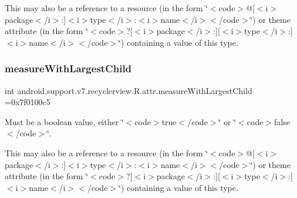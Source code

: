 This may also be a reference to a resource (in the form \char`\"{}$<$code$>$@\mbox{[}$<$i$>$package$<$/i$>$\+:\mbox{]}$<$i$>$type$<$/i$>$\+:$<$i$>$name$<$/i$>$$<$/code$>$\char`\"{}) or theme attribute (in the form \char`\"{}$<$code$>$?\mbox{[}$<$i$>$package$<$/i$>$\+:\mbox{]}\mbox{[}$<$i$>$type$<$/i$>$\+:\mbox{]}$<$i$>$name$<$/i$>$$<$/code$>$\char`\"{}) containing a value of this type. \mbox{\label{classandroid_1_1support_1_1v7_1_1recyclerview_1_1R_1_1attr_a4fb10290c925ace1bca08d51cedbf11a}} 
\subsubsection{\texorpdfstring{measure\+With\+Largest\+Child}{measureWithLargestChild}}
{\footnotesize\ttfamily int android.\+support.\+v7.\+recyclerview.\+R.\+attr.\+measure\+With\+Largest\+Child =0x7f0100c5\hspace{0.3cm}{\ttfamily [static]}}

Must be a boolean value, either \char`\"{}$<$code$>$true$<$/code$>$\char`\"{} or \char`\"{}$<$code$>$false$<$/code$>$\char`\"{}. 

This may also be a reference to a resource (in the form \char`\"{}$<$code$>$@\mbox{[}$<$i$>$package$<$/i$>$\+:\mbox{]}$<$i$>$type$<$/i$>$\+:$<$i$>$name$<$/i$>$$<$/code$>$\char`\"{}) or theme attribute (in the form \char`\"{}$<$code$>$?\mbox{[}$<$i$>$package$<$/i$>$\+:\mbox{]}\mbox{[}$<$i$>$type$<$/i$>$\+:\mbox{]}$<$i$>$name$<$/i$>$$<$/code$>$\char`\"{}) containing a value of this type. \mbox{\label{classandroid_1_1support_1_1v7_1_1recyclerview_1_1R_1_1attr_ad836cb313295e5092e4a8b7e7f471585}} 
